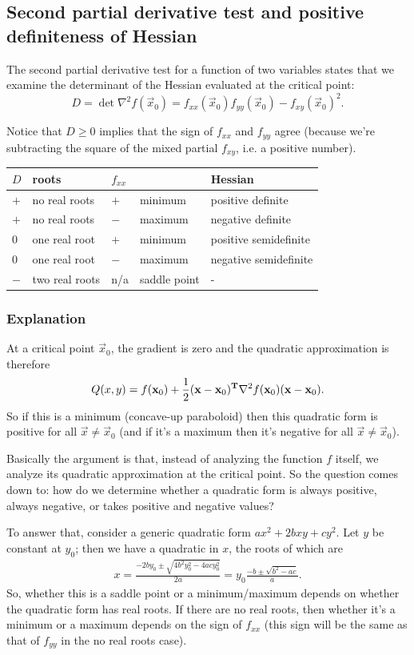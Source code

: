 \documentclass[12pt]{article}
\begin{document}
\subsection*{Second partial derivative test and positive definiteness of Hessian}

The second partial derivative test for a function of two variables states that
we examine the determinant of the Hessian evaluated at the critical point:
$$
D = \det \nabla^2 f(\vec x_0) = f_{xx}(\vec x_0)f_{yy}(\vec x_0) - f_{xy}(\vec x_0)^2.
$$

Notice that $D \geq 0$ implies that the sign of $f_{xx}$ and $f_{yy}$ agree
(because we're subtracting the square of the mixed partial $f_{xy}$, i.e. a
positive number).

\begin{tabular}{ l l l l l }
  $D$    & roots          & $f_{xx}$ &  & Hessian \\
  \hline
  $+$    & no real roots  & $+$     & minimum        & positive definite \\
  $+$    & no real roots  & $-$     & maximum        & negative definite \\
  $0$    & one real root  & $+$     & minimum        & positive semidefinite \\
  $0$    & one real root  & $-$     & maximum        & negative semidefinite \\
  $-$    & two real roots & n/a     & saddle point   & - \\
\end{tabular}

\subsubsection*{Explanation}
At a critical point $\vec x_0$, the gradient is zero and the quadratic approximation is therefore
$$
Q(x, y) = f(\mathbf x_0) + \frac{1}{2}(\mathbf x - \mathbf x_0)^{\mathbf{T}} \nabla^2 f(\mathbf x_0)(\mathbf x - \mathbf x_0).
$$
So if this is a minimum (concave-up paraboloid) then this quadratic form is
positive for all $\vec x \neq \vec x_0$ (and if it's a maximum then it's
negative for all $\vec x \neq \vec x_0$).

Basically the argument is that, instead of analyzing the function $f$ itself,
we analyze its quadratic approximation at the critical point. So the question
comes down to: how do we determine whether a quadratic form is always positive,
always negative, or takes positive and negative values?

To answer that, consider a generic quadratic form $ax^2 + 2bxy + cy^2$. Let $y$
be constant at $y_0$; then we have a quadratic in $x$, the roots of which are
\begin{align*}
  x
  = \frac{-2by_0 \pm \sqrt{4b^2y_0^2 - 4acy_0^2}}{2a}
  = y_0\frac{-b \pm \sqrt{b^2 - ac}}{a}.
\end{align*}
So, whether this is a saddle point or a minimum/maximum depends on whether the
quadratic form has real roots. If there are no real roots, then whether it's a
minimum or a maximum depends on the sign of $f_{xx}$ (this sign will be the
same as that of $f_{yy}$ in the no real roots case).
\end{document}
